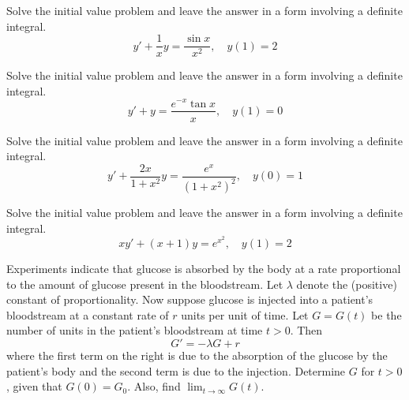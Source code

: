 \documentclass{ximera}
\begin{document}
\begin{problem}\label{exer:2.1.39} Solve the initial value problem and leave the answer in a form involving a definite integral.
$$y'+\frac{1}{x}y=\frac{\sin x}{x^2},\quad y(1)=2$$
\end{problem}

\begin{problem}\label{exer:2.1.40} Solve the initial value problem and leave the answer in a form involving a definite integral.
$$y'+y=\frac{e^{-x}\tan x}{x},\quad y(1)=0$$
\end{problem}

\begin{problem}\label{exer:2.1.41} Solve the initial value problem and leave the answer in a form involving a definite integral.
$$y'+\frac{2x}{1+x^2}y=\frac{e^x}{(1+x^2)^2}, \quad y(0)=1$$
\end{problem}

\begin{problem}\label{exer:2.1.42} Solve the initial value problem and leave the answer in a form involving a definite integral.
$$xy'+(x+1)y=e^{x^2},\quad y(1)=2$$
\end{problem}

\begin{problem}\label{exer:2.1.43}
Experiments indicate that glucose is absorbed by the body at a rate proportional to the amount of glucose present in the bloodstream. Let $\lambda$ denote the (positive) constant of proportionality. Now suppose glucose is injected into a patient's bloodstream at a constant rate of $r$ units per unit of time. Let $G=G(t)$ be the number of units in the patient's bloodstream at time $t>0$. Then
$$G'=-\lambda G+r$$
where the first term on the right is due to the absorption of the glucose by the patient's body and the second term is due to the injection. Determine $G$ for $t>0$, given that $G(0)=G_0$. Also, find $\lim_{t\to\infty}G(t)$.
\end{problem}
\end{document}
